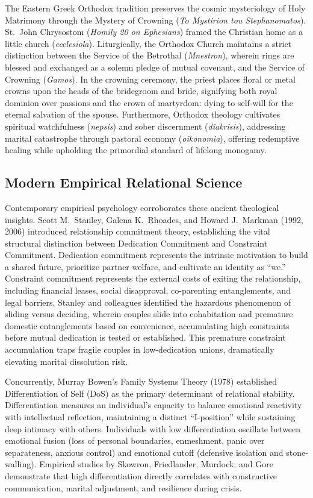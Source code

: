\documentclass[11pt,twocolumn]{article}
\begin{document}
The Eastern Greek Orthodox tradition preserves the cosmic mysteriology of Holy Matrimony through the Mystery of Crowning (\textit{To Mystirion tou Stephanomatos}). St.~John Chrysostom (\textit{Homily 20 on Ephesians}) framed the Christian home as a little church (\textit{ecclesiola}). Liturgically, the Orthodox Church maintains a strict distinction between the Service of the Betrothal (\textit{Mnestron}), wherein rings are blessed and exchanged as a solemn pledge of mutual covenant, and the Service of Crowning (\textit{Gamos}). In the crowning ceremony, the priest places floral or metal crowns upon the heads of the bridegroom and bride, signifying both royal dominion over passions and the crown of martyrdom: dying to self-will for the eternal salvation of the spouse. Furthermore, Orthodox theology cultivates spiritual watchfulness (\textit{nepsis}) and sober discernment (\textit{diakrisis}), addressing marital catastrophe through pastoral economy (\textit{oikonomia}), offering redemptive healing while upholding the primordial standard of lifelong monogamy.

\subsection{Modern Empirical Relational Science}
Contemporary empirical psychology corroborates these ancient theological insights. Scott M.~Stanley, Galena K.~Rhoades, and Howard J.~Markman (1992, 2006) introduced relationship commitment theory, establishing the vital structural distinction between Dedication Commitment and Constraint Commitment. Dedication commitment represents the intrinsic motivation to build a shared future, prioritize partner welfare, and cultivate an identity as ``we.'' Constraint commitment represents the external costs of exiting the relationship, including financial leases, social disapproval, co-parenting entanglements, and legal barriers. Stanley and colleagues identified the hazardous phenomenon of sliding versus deciding, wherein couples slide into cohabitation and premature domestic entanglements based on convenience, accumulating high constraints before mutual dedication is tested or established. This premature constraint accumulation traps fragile couples in low-dedication unions, dramatically elevating marital dissolution risk.

Concurrently, Murray Bowen's Family Systems Theory (1978) established Differentiation of Self (DoS) as the primary determinant of relational stability. Differentiation measures an individual's capacity to balance emotional reactivity with intellectual reflection, maintaining a distinct ``I-position'' while sustaining deep intimacy with others. Individuals with low differentiation oscillate between emotional fusion (loss of personal boundaries, enmeshment, panic over separateness, anxious control) and emotional cutoff (defensive isolation and stone-walling). Empirical studies by Skowron, Friedlander, Murdock, and Gore demonstrate that high differentiation directly correlates with constructive communication, marital adjustment, and resilience during crisis.
\end{document}
